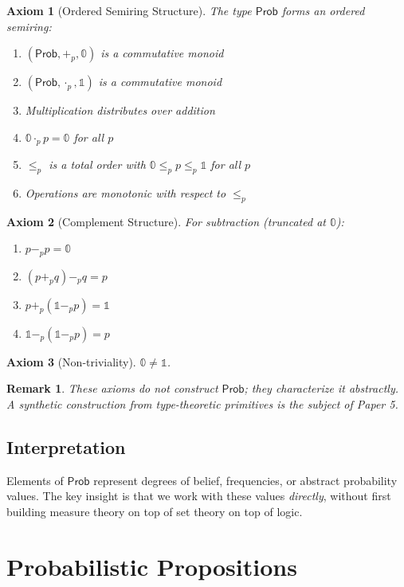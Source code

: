 \documentclass[11pt,a4paper]{article}
\newtheorem{axiom}{Axiom}
\newtheorem{remark}[theorem]{Remark}
\newcommand{\Prob}{\mathsf{Prob}}
\newcommand{\pzero}{\mathbb{0}}
\newcommand{\pone}{\mathbb{1}}
\newcommand{\ple}{\leq_p}
\newcommand{\padd}{+_p}
\newcommand{\pmul}{\cdot_p}
\newcommand{\psub}{-_p}
\begin{document}
\begin{axiom}[Ordered Semiring Structure]
The type $\Prob$ forms an ordered semiring:
\begin{enumerate}[label=(\alph*)]
    \item $(\Prob, \padd, \pzero)$ is a commutative monoid
    \item $(\Prob, \pmul, \pone)$ is a commutative monoid
    \item Multiplication distributes over addition
    \item $\pzero \pmul p = \pzero$ for all $p$
    \item $\ple$ is a total order with $\pzero \ple p \ple \pone$ for all $p$
    \item Operations are monotonic with respect to $\ple$
\end{enumerate}
\end{axiom}

\begin{axiom}[Complement Structure]
For subtraction (truncated at $\pzero$):
\begin{enumerate}[label=(\alph*)]
    \item $p \psub p = \pzero$
    \item $(p \padd q) \psub q = p$
    \item $p \padd (\pone \psub p) = \pone$
    \item $\pone \psub (\pone \psub p) = p$
\end{enumerate}
\end{axiom}

\begin{axiom}[Non-triviality]
$\pzero \neq \pone$.
\end{axiom}

\begin{remark}
These axioms do not construct $\Prob$; they characterize it abstractly. A synthetic construction from type-theoretic primitives is the subject of Paper 5.
\end{remark}

\subsection{Interpretation}

Elements of $\Prob$ represent degrees of belief, frequencies, or abstract probability values. The key insight is that we work with these values \emph{directly}, without first building measure theory on top of set theory on top of logic.

\section{Probabilistic Propositions}
\end{document}
